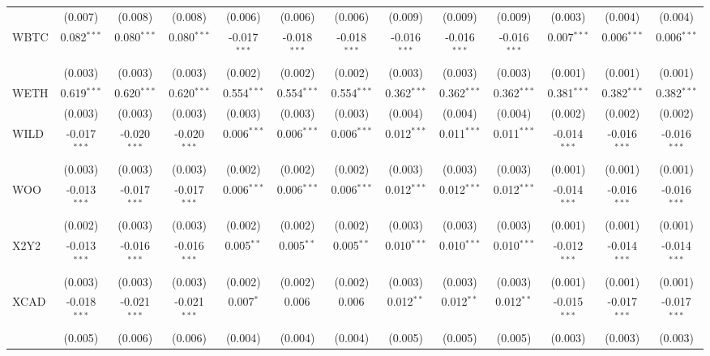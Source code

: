 \begin{table}[!htbp]
\begin{tabular}{@{\extracolsep{5pt}}lcccccccccccc}
  & (0.007) & (0.008) & (0.008) & (0.006) & (0.006) & (0.006) & (0.009) & (0.009) & (0.009) & (0.003) & (0.004) & (0.004) \\
 WBTC & 0.082$^{***}$ & 0.080$^{***}$ & 0.080$^{***}$ & -0.017$^{***}$ & -0.018$^{***}$ & -0.018$^{***}$ & -0.016$^{***}$ & -0.016$^{***}$ & -0.016$^{***}$ & 0.007$^{***}$ & 0.006$^{***}$ & 0.006$^{***}$ \\
  & (0.003) & (0.003) & (0.003) & (0.002) & (0.002) & (0.002) & (0.003) & (0.003) & (0.003) & (0.001) & (0.001) & (0.001) \\
 WETH & 0.619$^{***}$ & 0.620$^{***}$ & 0.620$^{***}$ & 0.554$^{***}$ & 0.554$^{***}$ & 0.554$^{***}$ & 0.362$^{***}$ & 0.362$^{***}$ & 0.362$^{***}$ & 0.381$^{***}$ & 0.382$^{***}$ & 0.382$^{***}$ \\
  & (0.003) & (0.003) & (0.003) & (0.003) & (0.003) & (0.003) & (0.004) & (0.004) & (0.004) & (0.002) & (0.002) & (0.002) \\
 WILD & -0.017$^{***}$ & -0.020$^{***}$ & -0.020$^{***}$ & 0.006$^{***}$ & 0.006$^{***}$ & 0.006$^{***}$ & 0.012$^{***}$ & 0.011$^{***}$ & 0.011$^{***}$ & -0.014$^{***}$ & -0.016$^{***}$ & -0.016$^{***}$ \\
  & (0.003) & (0.003) & (0.003) & (0.002) & (0.002) & (0.002) & (0.003) & (0.003) & (0.003) & (0.001) & (0.001) & (0.001) \\
 WOO & -0.013$^{***}$ & -0.017$^{***}$ & -0.017$^{***}$ & 0.006$^{***}$ & 0.006$^{***}$ & 0.006$^{***}$ & 0.012$^{***}$ & 0.012$^{***}$ & 0.012$^{***}$ & -0.014$^{***}$ & -0.016$^{***}$ & -0.016$^{***}$ \\
  & (0.002) & (0.003) & (0.003) & (0.002) & (0.002) & (0.002) & (0.003) & (0.003) & (0.003) & (0.001) & (0.001) & (0.001) \\
 X2Y2 & -0.013$^{***}$ & -0.016$^{***}$ & -0.016$^{***}$ & 0.005$^{**}$ & 0.005$^{**}$ & 0.005$^{**}$ & 0.010$^{***}$ & 0.010$^{***}$ & 0.010$^{***}$ & -0.012$^{***}$ & -0.014$^{***}$ & -0.014$^{***}$ \\
  & (0.003) & (0.003) & (0.003) & (0.002) & (0.002) & (0.002) & (0.003) & (0.003) & (0.003) & (0.001) & (0.001) & (0.001) \\
 XCAD & -0.018$^{***}$ & -0.021$^{***}$ & -0.021$^{***}$ & 0.007$^{*}$ & 0.006$^{}$ & 0.006$^{}$ & 0.012$^{**}$ & 0.012$^{**}$ & 0.012$^{**}$ & -0.015$^{***}$ & -0.017$^{***}$ & -0.017$^{***}$ \\
  & (0.005) & (0.006) & (0.006) & (0.004) & (0.004) & (0.004) & (0.005) & (0.005) & (0.005) & (0.003) & (0.003) & (0.003) \\

\end{tabular}
\end{table}
